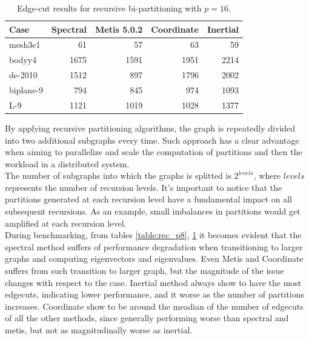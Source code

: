 \documentclass[unicode,11pt,a4paper,oneside,numbers=endperiod,openany]{scrartcl}
\begin{document}
\begin{table}[H]
    \caption{Edge-cut results for recursive bi-partitioning with $p=16$.}
    \centering
    \begin{tabular}{l|r|r|r|r} \hline\hline
        Case      & Spectral & Metis 5.0.2 & Coordinate & Inertial \\ \hline
        mesh3e1   & 61       & 57          & 63         & 59       \\
        bodyy4    & 1675     & 1591        & 1951       & 2214     \\
        de-2010   & 1512     & 897         & 1796       & 2002     \\
        biplane-9 & 794      & 845         & 974        & 1093     \\
        L-9       & 1121     & 1019        & 1028       & 1377     \\  \hline \hline
    \end{tabular}
    \label{table:rec_p16}
\end{table}

By applying recursive partitioning algorithms, the graph is repeatedly divided into two additional subgraphs every time.
Such approach has a clear advantage when aiming to parallelize and scale the computation of partitions and then the workload
in a distributed system. \\

The number of subgraphs into which the graphs is splitted is $2^{levels}$, where $levels$ represents the number of recursion levels.
It's important to notice that the partitions generated at each recursion level have a fundamental impact on all subsequent recursions.
As an example, small imbalances in partitions would get amplified at each recursion level. \\

During benchmarking, from tables \ref{table:rec_p8}, \ref{table:rec_p16} it becomes evident that the spectral method suffers of performance degradation when transitioning  to larger graphs and computing eigenvectors and eigenvalues.
Even Metis and Coordinate suffers from such transition to larger graph, but the magnitude of the issue changes with respect to the case.
Inertial method always show to have the most edgecuts, indicating lower performance, and it worse as the number
of partitions increases.
Coordinate show to be around the meadian of the number of edgecuts of all the other methods, since generally
performing worse than spectral and metis, but not as magnitudinally worse as inertial. \\
\end{document}
